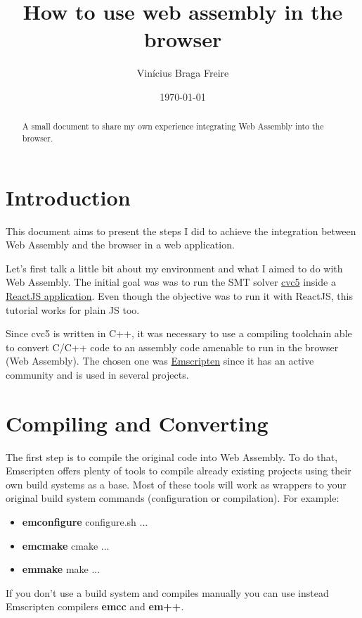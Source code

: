 \documentclass[12pt, a4paper]{article}
\title{How to use web assembly in the browser}
\author{Vinícius Braga Freire}
\date{\today}
\begin{document}
\maketitle

\begin{abstract}
    A small document to share my own experience integrating Web Assembly into the browser.
\end{abstract}


\section{Introduction}

This document aims to present the steps I did to achieve the integration between Web Assembly and the browser in a web application.

Let's first talk a little bit about my environment and what I aimed to do with
Web Assembly. The initial goal was was to run the SMT solver \href{https://cvc5.github.io/}{cvc5} inside a \href{https://ufmg-smite.github.io/proof-visualizer/}{ReactJS application}. Even though the objective was to run it with ReactJS, this tutorial works for plain JS too.

Since cvc5 is written in C++, it was necessary to use a compiling toolchain able
to convert C/C++ code to an assembly code amenable to run in the browser (Web
Assembly). The chosen one was \href{https://emscripten.org/}{Emscripten} since
it has an active community and is used in several projects.

\section{Compiling and Converting}

The first step is to compile the original code into Web Assembly. To do that,
Emscripten offers plenty of tools to compile already existing projects using
their own build systems as a base. Most of these tools will work as wrappers to
your original build system commands (configuration or compilation). For example:
\begin{itemize}
    \item \textbf{emconfigure} configure.sh ...
    \item \textbf{emcmake} cmake ...
    \item \textbf{emmake} make ...
\end{itemize}

If you don't use a build system and compiles manually you can use instead Emscripten compilers \textbf{emcc} and \textbf{em++}.
\end{document}
